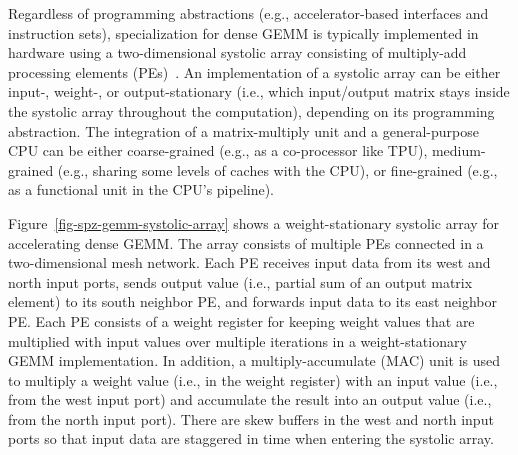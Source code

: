 Regardless of programming abstractions (e.g., accelerator-based interfaces and
instruction sets), specialization for dense GEMM is typically implemented in
hardware using a two-dimensional systolic array consisting of multiply-add
processing elements
(PEs)~\cite{jouppi-datacenter-isca2017,jeong-rasa-dac2021,nassif-intel-sapphire-isscc2022}.
An implementation of a systolic array can be either input-, weight-, or
output-stationary (i.e., which input/output matrix stays inside the systolic
array throughout the computation), depending on its programming abstraction.
The integration of a matrix-multiply unit and a general-purpose CPU can be
either coarse-grained (e.g., as a co-processor like TPU), medium-grained (e.g.,
sharing some levels of caches with the CPU), or fine-grained (e.g., as a
functional unit in the CPU's pipeline).

Figure~\ref{fig-spz-gemm-systolic-array} shows a weight-stationary systolic
array for accelerating dense GEMM.
The array consists of multiple PEs connected in a two-dimensional mesh network.
Each PE receives input data from its west and north input ports, sends
output value (i.e., partial sum of an output matrix element) to its south
neighbor PE, and forwards input data to its east neighbor PE.
Each PE consists of a weight register for keeping weight values that are
multiplied with input values over multiple iterations in a weight-stationary
GEMM implementation.
In addition, a multiply-accumulate (MAC) unit is used to multiply a weight
value (i.e., in the weight register) with an input value (i.e., from the west
input port) and accumulate the result into an output value (i.e., from the
north input port).
There are skew buffers in the west and north input ports so that input data are
staggered in time when entering the systolic array.
